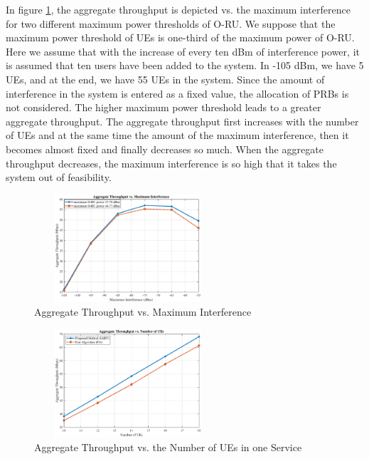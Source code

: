 \documentclass[lettersize,journal]{IEEEtran}
\begin{document}
In figure \ref{fig:13}, the aggregate throughput is depicted vs. the maximum interference for two different maximum power thresholds of O-RU. We suppose that the maximum power threshold of UEs is one-third of the maximum power of O-RU.
Here we assume that with the increase of every ten dBm of interference power, it is assumed that ten users have been added to the system. In -105 dBm, we have 5 UEs, and at the end, we have 55 UEs in the system.
Since the amount of interference in the system is entered as a fixed value,
the allocation of PRBs is not considered.
The higher maximum power threshold leads to a greater aggregate throughput.
The aggregate throughput first increases with the number of UEs and at the same time the amount of the maximum interference, then it becomes almost fixed and finally decreases so much. When the aggregate throughput decreases, the maximum interference is so high that it takes the system out of feasibility.
\begin{figure}%
  \centering
  \captionsetup{justification=centering}
   \includegraphics[width=7cm,height=4cm]{interF_new.eps}
  \caption{\small Aggregate Throughput vs. Maximum Interference }
  \label{fig:13}
\end{figure}
\begin{figure}%
  \centering
  \captionsetup{justification=centering}
    \includegraphics[width=7cm,height=4cm]{FA.eps}
  \caption{\small Aggregate Throughput vs. the Number of UEs in one Service }
  \label{fig:14}

\end{figure}
\end{document}
